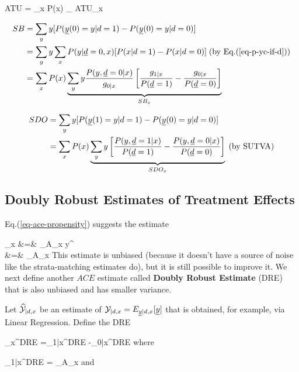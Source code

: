 \beq
ATU
=
\sum_x P(x)
_
{ATU_x}
\eeq

\begin{align}
SB&= \sum_y y
[P(\rvy(0)=y|d=1)-P(\rvy(0)=y|d=0)]
\\
&=
\sum_y y
\sum_x P(y| \rvd=0,x)
[
P(x|d=1)-P(x|d=0)]
\;\text{(by Eq.(\ref{eq-p-yc-if-d}))}
\\
&=
\sum_x P(x)
\underbrace{\sum_y y
\frac{P(y, \rvd=0|x)}{g_{0|x}}
\left[
\frac{g_{1|x}}{P(\rvd=1)}
-
\frac{g_{0|x}}{P(\rvd=0)}
\right]}_{SB_x}
\end{align}

\begin{align}
SDO
&=
\sum_y y
[P(\rvy(1)=y|d=1)-P(\rvy(0)=y|d=0)]
\\
&=
\sum_x P(x)
\underbrace{\sum_y y
\left[
\frac{P(y, \rvd=1|x)}{P(\rvd=1)}
-
\frac{P(y, \rvd=0|x)}{P(\rvd=0)}
\right]}_{SDO_x}
\;\text{(by SUTVA)}
\end{align}



\subsection{Doubly Robust Estimates of Treatment Effects}



Eq.(\ref{eq-ace-propensity})
 suggests the estimate

\beqa
{}_x
&=&
\sum_{\s\in A_x}
y^\s
{}
\\
&=&
\sum_{\s \in A_x}
\label{eq-ace-esti-posi}
\eeqa
This
estimate is unbiased
(because it doesn't
have a source
of noise like the
strata-matching
estimates do),
but it is still possible to
improve it.
We next
define
another $ACE$ estimate
called
{\bf Doubly Robust Estimate} (DRE)
that is also
unbiased and has smaller
variance.

Let
${\widehat{{\cal Y}}}_{|d, x}$
be an estimate
of $\caly_{|d, x}
=E_{\rvy|d,x}[\rvy]$
that is
obtained, for
example, via Linear Regression.
Define the DRE

\beq
{}_x^{DRE}
=\HAT{\caly}_{1|x}^{DRE}
-\HAT{\caly}_{0|x}^{DRE}
\eeq
where

\beq
\HAT{\caly}_{1|x}^{DRE}
=
\sum_{\s\in A_x}
\eeq
and

